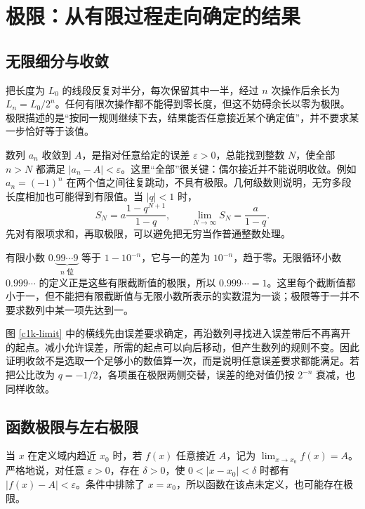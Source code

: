 
\section{极限：从有限过程走向确定的结果}
\subsection{无限细分与收敛}
把长度为 $L_0$ 的线段反复对半分，每次保留其中一半，经过 $n$ 次操作后余长为 $L_n=L_0/2^n$。任何有限次操作都不能得到零长度，但这不妨碍余长以零为极限。极限描述的是“按同一规则继续下去，结果能否任意接近某个确定值”，并不要求某一步恰好等于该值。

数列 $a_n$ 收敛到 $A$，是指对任意给定的误差 $\varepsilon>0$，总能找到整数 $N$，使全部 $n>N$ 都满足 $|a_n-A|<\varepsilon$。这里“全部”很关键：偶尔接近并不能说明收敛。例如 $a_n=(-1)^n$ 在两个值之间往复跳动，不具有极限。几何级数则说明，无穷多段长度相加也可能得到有限值。当 $|q|<1$ 时，
\[
 S_N=a\frac{1-q^{N+1}}{1-q},\qquad
 \lim_{N\to\infty}S_N=\frac a{1-q}.
\]
先对有限项求和，再取极限，可以避免把无穷当作普通整数处理。

有限小数 $0.\underbrace{99\cdots9}_{n\text{ 位}}$ 等于 $1-10^{-n}$，它与一的差为 $10^{-n}$，趋于零。无限循环小数 $0.999\cdots$ 的定义正是这些有限截断值的极限，所以 $0.999\cdots=1$。这里每个截断值都小于一，但不能把有限截断值与无限小数所表示的实数混为一谈；极限等于一并不要求数列中某一项先达到一。

图 \ref{c1k-limit} 中的横线先由误差要求确定，再沿数列寻找进入误差带后不再离开的起点。减小允许误差，所需的起点可以向后移动，但产生数列的规则不变。因此证明收敛不是选取一个足够小的数值算一次，而是说明任意误差要求都能满足。若把公比改为 $q=-1/2$，各项虽在极限两侧交替，误差的绝对值仍按 $2^{-n}$ 衰减，也同样收敛。

\subsection{函数极限与左右极限}
当 $x$ 在定义域内趋近 $x_0$ 时，若 $f(x)$ 任意接近 $A$，记为 $\lim_{x\to x_0}f(x)=A$。严格地说，对任意 $\varepsilon>0$，存在 $\delta>0$，使 $0<|x-x_0|<\delta$ 时都有 $|f(x)-A|<\varepsilon$。条件中排除了 $x=x_0$，所以函数在该点未定义，也可能存在极限。

